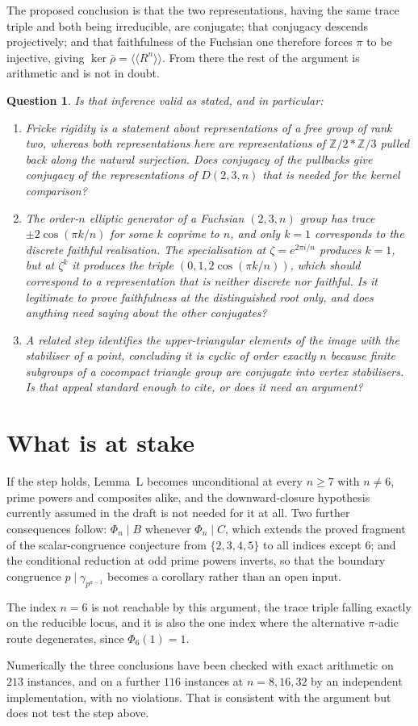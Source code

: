 \documentclass[11pt]{amsart}
\newtheorem{question}{Question}
\theoremstyle{definition}
\newcommand{\Z}{\mathbb{Z}}
\newcommand{\Phin}[1]{\Phi_{#1}}
\begin{document}
The proposed conclusion is that the two representations, having the same trace
triple and both being irreducible, are conjugate; that conjugacy descends
projectively; and that faithfulness of the Fuchsian one therefore forces $\pi$
to be injective, giving
$\ker\bar\rho=\langle\langle R^{n}\rangle\rangle$. From there the rest of the
argument is arithmetic and is not in doubt.

\begin{question}
Is that inference valid as stated, and in particular:
\begin{enumerate}
\item Fricke rigidity is a statement about representations of a free group of
rank two, whereas both representations here are representations of
$\Z/2 * \Z/3$ pulled back along the natural surjection. Does conjugacy of the
pullbacks give conjugacy of the representations of $D(2,3,n)$ that is needed
for the kernel comparison?
\item The order-$n$ elliptic generator of a Fuchsian $(2,3,n)$ group has trace
$\pm 2\cos(\pi k/n)$ for some $k$ coprime to $n$, and only $k=1$ corresponds to
the discrete faithful realisation. The specialisation at $\zeta=e^{2\pi i/n}$
produces $k=1$, but at $\zeta^{k}$ it produces the triple
$(0,1,2\cos(\pi k/n))$, which should correspond to a representation that is
neither discrete nor faithful. Is it legitimate to prove faithfulness at the
distinguished root only, and does anything need saying about the other
conjugates?
\item A related step identifies the upper-triangular elements of the image with
the stabiliser of a point, concluding it is cyclic of order exactly $n$ because
finite subgroups of a cocompact triangle group are conjugate into vertex
stabilisers. Is that appeal standard enough to cite, or does it need an
argument?
\end{enumerate}
\end{question}

\section*{What is at stake}

If the step holds, Lemma~L becomes unconditional at every $n\ge 7$ with
$n\ne 6$, prime powers and composites alike, and the downward-closure
hypothesis currently assumed in the draft is not needed for it at all. Two
further consequences follow: $\Phin{n}\mid B$ whenever $\Phin{n}\mid C$, which
extends the proved fragment of the scalar-congruence conjecture from
$\{2,3,4,5\}$ to all indices except $6$; and the conditional reduction at odd
prime powers inverts, so that the boundary congruence
$p\mid\gamma_{p^{a-1}}$ becomes a corollary rather than an open input.

The index $n=6$ is not reachable by this argument, the trace triple falling
exactly on the reducible locus, and it is also the one index where the
alternative $\pi$-adic route degenerates, since $\Phin{6}(1)=1$.

Numerically the three conclusions have been checked with exact arithmetic on
$213$ instances, and on a further $116$ instances at $n=8,16,32$ by an
independent implementation, with no violations. That is consistent with the
argument but does not test the step above.
\end{document}
